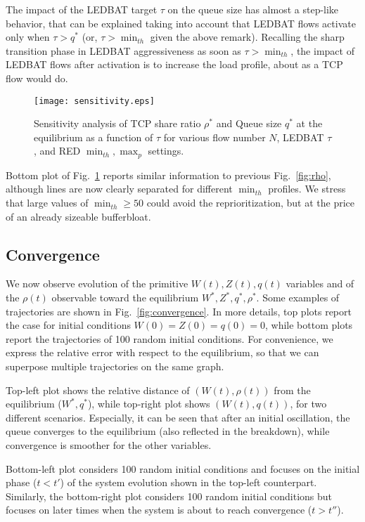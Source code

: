 \documentclass[conference]{IEEEtran}
\newcommand{\secL}[1]{\label{sec:#1}}
\newcommand{\figR}[1]{Fig.~\ref{fig:#1}}
\newcommand{\figLC}[2]{
		\caption{#2}
		\label{fig:#1}
}
\begin{document}
The impact of the LEDBAT target $\tau$ on the queue size has almost a step-like behavior, that can be explained taking into account that LEDBAT flows activate only when $\tau>q^*$ (or, $\tau>\min_{th}$ given the above remark). 
Recalling the sharp transition phase in LEDBAT aggressiveness as soon as $\tau>\min_{th}$, the impact of LEDBAT flows after activation is to increase the load profile, about as a TCP flow would do.


\begin{figure}[t]
    \begin{center}
		\texttt{[image: sensitivity.eps]}
        \figLC{sensitivity}{Sensitivity analysis of TCP share ratio $\rho^*$ and Queue size $q^*$ at the equilibrium as a function of $\tau$ for various flow number $N$, LEDBAT $\tau$, and RED $\min_{th}, \max_p$ settings.}
    \end{center}
\end{figure}


Bottom plot of \figR{sensitivity} reports similar information to previous \figR{rho}, although lines are now clearly separated for different $\min_{th}$ profiles. We stress that large values of $\min_{th}\ge 50$ could avoid the reprioritization, but at the price of an already sizeable bufferbloat. 

\subsection{Convergence}\secL{convergence}

We now observe evolution of the primitive $W(t),Z(t),q(t)$ variables and of the $\rho(t)$ observable toward the equilibrium $W^*,Z^*,q^*,\rho^*$. Some examples of trajectories are shown in \figR{convergence}.
In more details, top plots report the case for initial conditions $W(0)=Z(0)=q(0)=0$, while bottom plots report the trajectories of 100 random initial conditions. For convenience, we express the relative error with respect to the equilibrium, so that we can superpose multiple trajectories on the same graph.

Top-left plot shows the relative distance of $(W(t),\rho(t))$ from the equilibrium ($W^*,q^*$), while top-right plot shows $(W(t),q(t))$, for two different scenarios. Especially, it can be seen that after an initial oscillation, the queue converges to the equilibrium (also reflected in the breakdown), while convergence is smoother for the other variables.

Bottom-left plot considers 100 random initial conditions and focuses on the initial phase ($t<t'$)  of the system evolution  shown in the top-left counterpart. Similarly, the bottom-right plot considers 100 random initial conditions but focuses on later times when the system is about to reach convergence ($t>t''$).
\end{document}
